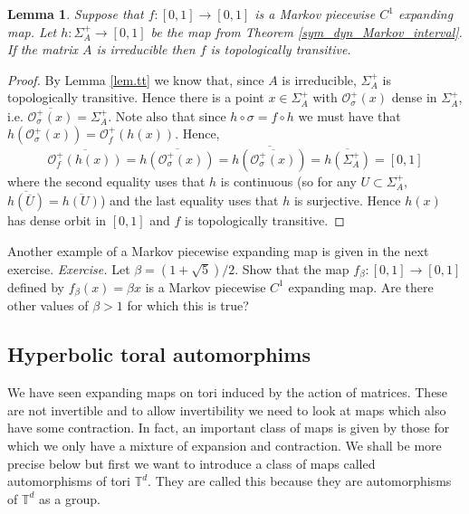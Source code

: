 \documentclass[12pt]{article}
\newtheorem{lemma}[theorem]{Lemma}
\theoremstyle{definition}
\theoremstyle{remark}
\begin{document}
\begin{lemma}
Suppose that $f:[0,1] \to [0,1]$ is a Markov piecewise $C^1$ expanding map. Let $h: \Sigma_A^+ \to [0,1]$ be the map from Theorem \ref{sym_dyn_Markov_interval}. If the matrix $A$ is irreducible then $f$ is topologically transitive.
\end{lemma}

\begin{proof}
By Lemma \ref{lem.tt} we know that, since $A$ is irreducible, $\Sigma_A^+$ is topologically transitive. Hence there is a point $x \in \Sigma_A^+$ with $\mathcal{O}_\sigma^+(x)$ dense in $\Sigma_A^+$, i.e. $\overline{\mathcal{O}_\sigma^+(x)} = \Sigma_A^+$. Note also that since $h \circ \sigma = f \circ h$ we must have that $ h(\mathcal{O}_\sigma^+(x))= \mathcal{O}_f^+(h(x))$. Hence,
\[
\overline{\mathcal{O}_f^+(h(x))} = \overline{h(\mathcal{O}_\sigma^+(x))} = \overline{h(\overline{\mathcal{O}_\sigma^+(x)})} = \overline{h(\Sigma_A^+)} =  [0,1]
\]
where the second equality uses that $h$ is continuous (so for any $U \subset \Sigma_A^+$, $\overline{h(\overline{U})} = \overline{h(U)}$) and the last equality uses that $h$ is surjective. Hence $h(x)$ has dense orbit in $[0,1]$ and $f$ is topologically transitive.
\end{proof}


Another example of a Markov piecewise expanding map is given in the next exercise.
\medskip
\noindent
{\it Exercise.}
Let $\beta= (1+\sqrt{5})/2$. Show that the map $f_\beta : [0,1] \to [0,1]$ defined by
$f_\beta(x) =\beta x$ is a Markov piecewise $C^1$ expanding map. Are there other values of $\beta>1$ for which this is true?





\subsection{Hyperbolic toral automorphims}

We have seen expanding maps on tori induced by the action of matrices. These are not invertible and
to allow invertibility we need to look at maps which also have some contraction.
In fact, an important class of maps is given by those for which we only have a mixture of expansion
and contraction. We shall be more precise below but first we want to introduce a class of maps called automorphisms of tori $\mathbb T^d$. They are called this because they are automorphisms of $\mathbb T^d$
as a group.
\end{document}
